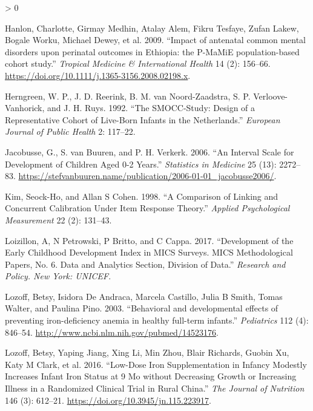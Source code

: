\documentclass[
]{book}
\newlength{\cslhangindent}
\newenvironment{CSLReferences}[2] %
 {%
  \setlength{\parindent}{0pt}
  \ifodd #1 \everypar{\setlength{\hangindent}{\cslhangindent}}\ignorespaces\fi
  \ifnum #2 > 0
  \setlength{\parskip}{#2\baselineskip}
  \fi
 }%
 {}
\begin{document}
\begin{CSLReferences}{1}{0}
\leavevmode\hypertarget{ref-Hanlon2009}{}%
Hanlon, Charlotte, Girmay Medhin, Atalay Alem, Fikru Tesfaye, Zufan Lakew, Bogale Worku, Michael Dewey, et al. 2009. {``{Impact of antenatal common mental disorders upon perinatal outcomes in Ethiopia: the P-MaMiE population-based cohort study}.''} \emph{Tropical Medicine {\&} International Health} 14 (2): 156--66. \url{https://doi.org/10.1111/j.1365-3156.2008.02198.x}.

\leavevmode\hypertarget{ref-herngreen1992}{}%
Herngreen, W. P., J. D. Reerink, B. M. van Noord-Zaadstra, S. P. Verloove-Vanhorick, and J. H. Ruys. 1992. {``The SMOCC-Study: Design of a Representative Cohort of Live-Born Infants in the Netherlands.''} \emph{European Journal of Public Health} 2: 117--22.

\leavevmode\hypertarget{ref-jacobusse2006}{}%
Jacobusse, G., S. van Buuren, and P. H. Verkerk. 2006. {``An Interval Scale for Development of Children Aged 0-2 Years.''} \emph{Statistics in Medicine} 25 (13): 2272--83. \url{https://stefvanbuuren.name/publication/2006-01-01_jacobusse2006/}.

\leavevmode\hypertarget{ref-kim1998}{}%
Kim, Seock-Ho, and Allan S Cohen. 1998. {``A Comparison of Linking and Concurrent Calibration Under Item Response Theory.''} \emph{Applied Psychological Measurement} 22 (2): 131--43.

\leavevmode\hypertarget{ref-loizillon2017}{}%
Loizillon, A, N Petrowski, P Britto, and C Cappa. 2017. {``Development of the Early Childhood Development Index in MICS Surveys. MICS Methodological Papers, No. 6. Data and Analytics Section, Division of Data.''} \emph{Research and Policy. New York: UNICEF}.

\leavevmode\hypertarget{ref-Lozoff2003}{}%
Lozoff, Betsy, Isidora De Andraca, Marcela Castillo, Julia B Smith, Tomas Walter, and Paulina Pino. 2003. {``{Behavioral and developmental effects of preventing iron-deficiency anemia in healthy full-term infants.}''} \emph{Pediatrics} 112 (4): 846--54. \url{http://www.ncbi.nlm.nih.gov/pubmed/14523176}.

\leavevmode\hypertarget{ref-Lozoff2016}{}%
Lozoff, Betsy, Yaping Jiang, Xing Li, Min Zhou, Blair Richards, Guobin Xu, Katy M Clark, et al. 2016. {``{Low-Dose Iron Supplementation in Infancy Modestly Increases Infant Iron Status at 9 Mo without Decreasing Growth or Increasing Illness in a Randomized Clinical Trial in Rural China.}''} \emph{The Journal of Nutrition} 146 (3): 612--21. \url{https://doi.org/10.3945/jn.115.223917}.


\end{CSLReferences}
\end{document}
